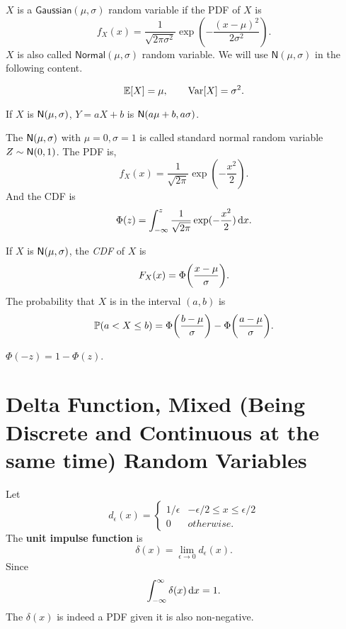 \begin{definition}
    $X$ is a $\mathsf{Gaussian}(\mu, \sigma)$ random variable if the \textnormal{PDF} of $X$ is
    \[f_X(x)=\frac{1}{\sqrt{2\pi\sigma^2}}\exp(-\frac{(x-\mu)^2}{2\sigma^2}).\]
    $X$ is also called $\mathsf{Normal}(\mu,\sigma)$ random variable. We will use $\mathsf{N}(\mu, \sigma)$ in the following content.
\end{definition}

\begin{theorem}
    \[\E{X} = \mu, \qquad \Var[X] = \sigma^2.\]
\end{theorem}

\begin{theorem}
    If $X$ is $\mathsf{N}(\mu,\sigma)$, $Y=aX+b$ is $\mathsf{N}(a\mu+b,a\sigma)$.
\end{theorem}

\begin{definition}
    The $\mathsf{N}(\mu,\sigma)$ with $\mu=0, \sigma=1$ is called standard normal random variable $Z\sim\mathsf{N}(0,1)$. The PDF is,
    \[f_X(x)=\frac{1}{\sqrt{2\pi}}\exp(-\frac{x^2}{2}).\]
    And the CDF is
    \[\Phi(z)=\int_{-\infty}^{z}\frac{1}{\sqrt{2\pi}}\exp(-\frac{x^2}{2})\mathop{}\!\mathrm{d} x.\]
\end{definition}

\begin{theorem}
    If $X$ is $\mathsf{N}(\mu,\sigma)$, the \emph{CDF} of $X$ is
    \[F_X(x)=\Phi\parens*{\frac{x-\mu}{\sigma}}.\]
    The probability that $X$ is in the interval \emph{$(a,b)$} is
    \[\P{a<X\leq b}=\Phi\parens*{\frac{b-\mu}{\sigma}}-\Phi\parens*{\frac{a-\mu}{\sigma}}.\]
\end{theorem}

\begin{theorem}
    $\Phi(-z)=1-\Phi(z)$.
\end{theorem}

\iffalse
\section{Delta Function, Mixed (Being Discrete and Continuous at the same time) Random Variables
}
\begin{definition}
    Let
    \[d_{\epsilon}(x)={
        \begin{cases}
            1/\epsilon & -\epsilon/2\leq x\leq \epsilon/2 \\
            0 & otherwise.
        \end{cases}
    }\]
    The \textbf{unit impulse function} is
    \[\delta(x)=\lim_{\epsilon\rightarrow 0}d_{\epsilon}(x).\]
    Since
    \[\int_{-\infty}^{\infty}\delta(x)\mathop{}\!\mathrm{d} x = 1.\]
    The $\delta(x)$ is indeed a PDF given it is also non-negative.
\end{definition}

